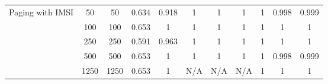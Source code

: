 \begin{table*}[]
{\begin{tabular}{ccccccccccc}
			\multicolumn{1}{|c|}{\multirow{6}{*}{Paging with IMSI}}           & \multicolumn{1}{c|}{50}            & \multicolumn{1}{c|}{50}                      & \multicolumn{1}{c|}{0.634}                & \multicolumn{1}{c|}{0.918}            & \multicolumn{1}{c|}{1}                        & \multicolumn{1}{c|}{1}                     & \multicolumn{1}{c|}{1}                 & \multicolumn{1}{c|}{1}                      & \multicolumn{1}{c|}{0.998}               & \multicolumn{1}{c|}{0.999}           \\ \cline{2-11}
			\multicolumn{1}{|c|}{}                                            & \multicolumn{1}{c|}{100}           & \multicolumn{1}{c|}{100}                     & \multicolumn{1}{c|}{0.653}                & \multicolumn{1}{c|}{1}                & \multicolumn{1}{c|}{1}                        & \multicolumn{1}{c|}{1}                     & \multicolumn{1}{c|}{1}                 & \multicolumn{1}{c|}{1}                      & \multicolumn{1}{c|}{1}                   & \multicolumn{1}{c|}{1}               \\ \cline{2-11}
			\multicolumn{1}{|c|}{}                                            & \multicolumn{1}{c|}{250}           & \multicolumn{1}{c|}{250}                     & \multicolumn{1}{c|}{0.591}                & \multicolumn{1}{c|}{0.963}            & \multicolumn{1}{c|}{1}                        & \multicolumn{1}{c|}{1}                     & \multicolumn{1}{c|}{1}                 & \multicolumn{1}{c|}{1}                      & \multicolumn{1}{c|}{1}                   & \multicolumn{1}{c|}{1}               \\ \cline{2-11}
			\multicolumn{1}{|c|}{}                                            & \multicolumn{1}{c|}{500}           & \multicolumn{1}{c|}{500}                     & \multicolumn{1}{c|}{0.653}                & \multicolumn{1}{c|}{1}                & \multicolumn{1}{c|}{1}                        & \multicolumn{1}{c|}{1}                     & \multicolumn{1}{c|}{1}                 & \multicolumn{1}{c|}{1}                      & \multicolumn{1}{c|}{0.998}               & \multicolumn{1}{c|}{0.999}           \\ \cline{2-11}
			\multicolumn{1}{|c|}{}                                            & \multicolumn{1}{c|}{1250}          & \multicolumn{1}{c|}{1250}                    & \multicolumn{1}{c|}{0.653}                & \multicolumn{1}{c|}{1}                & \multicolumn{1}{c|}{N/A}                      & \multicolumn{1}{c|}{N/A}                   & \multicolumn{1}{c|}{N/A}               & \multicolumn{1}{c|}{1}                      & \multicolumn{1}{c|}{1}                   & \multicolumn{1}{c|}{1}               \\ \cline{2-11}

\end{tabular}}
\end{table*}
